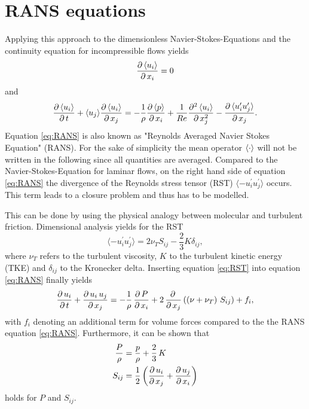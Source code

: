 \section{RANS equations} %
\label{sec:rans_equations}
Applying this approach to the dimensionless Navier-Stokes-Equations and the continuity equation for incompressible flows yields
\begin{equation}
	\frac{\partial\,\langle u_i \rangle}{\partial\,x_i} = 0
\end{equation}
and
\begin{equation}
	\label{eq:RANS}
	\frac{\partial\,\langle u_i \rangle}{\partial\,t} + \langle u_j \rangle \frac{\partial\,\langle u_i \rangle}{\partial\,x_j} = -\frac{1}{\rho} \frac{\partial\,\langle p \rangle}{\partial\,x_i}
	               																		+\frac{1}{Re} \frac{\partial^2\,\langle u_i \rangle}{\partial\,x_j^2}
	               																		-\frac{\partial\,\langle u_i^{\prime}u_j^{\prime} \rangle}{\partial\,x_j}.
\end{equation}
Equation \eqref{eq:RANS} is also known as "Reynolds Averaged Navier Stokes Equation" (RANS). For the sake of simplicity the mean operator $\left\langle \cdot \right\rangle$ will not be written in the following since all quantities are averaged. Compared to the Navier-Stokes-Equation for laminar flows, on the right hand side of equation \eqref{eq:RANS} the divergence of the Reynolds stress tensor (RST) $\langle -u_i^{\prime}u_j^{\prime} \rangle$ occurs. This term leads to a closure problem and thus has to be modelled.

This can be done by using the physical analogy between molecular and turbulent friction. Dimensional analysis yields for the RST
\begin{equation}
	\label{eq:RST}
	\langle -u_i^{\prime}u_j^{\prime} \rangle = 2\nu_T S_{ij} - \frac{2}{3} K \delta_{ij},
\end{equation}
where $\nu_T$ refers to the turbulent viscosity, $K$ to the turbulent kinetic energy (TKE) and $\delta_{ij}$ to the Kronecker delta.
Inserting equation \eqref{eq:RST} into equation \eqref{eq:RANS} finally yields
\begin{equation}
	\label{eq:RANSmodified}
	\frac{\partial\,u_i}{\partial\,t}+\frac{\partial\,u_i\,u_j}{\partial\,x_j}=-\frac{1}{\rho}\,\frac{\partial\,P}{\partial\,x_i}+2\,\frac{\partial\,}{\partial\,x_j}\left( \left(\nu+\nu_T\right)\,S_{ij} \right)+f_i,
\end{equation}
with $f_i$ denoting an additional term for volume forces compared to the the RANS equation \eqref{eq:RANS}. Furthermore, it can be shown that
\begin{equation}
	\begin{split}
		\frac{P}{\rho} &= \frac{p}{\rho}+\frac{2}{3}\,K \\
		S_{ij}         &= \frac{1}{2}\left(\frac{\partial\,u_i}{\partial\,x_j}+\frac{\partial\,u_j}{\partial\,x_i}\right)
	\end{split}
\end{equation}
holds for $P$ and $S_{ij}$. 

